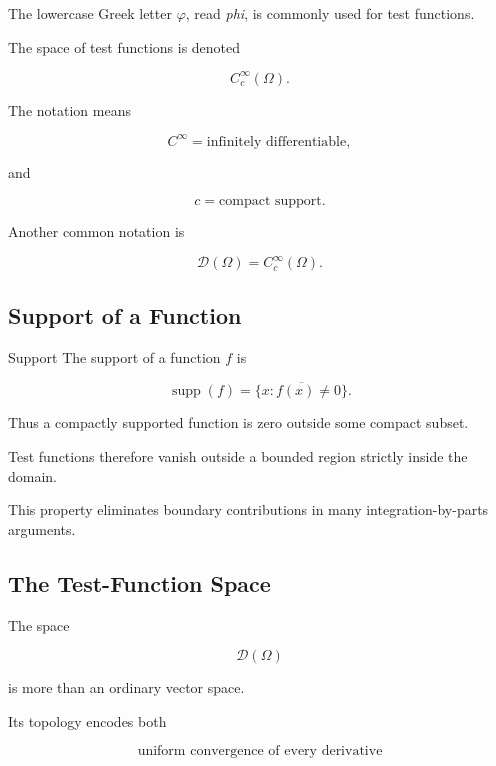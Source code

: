 The lowercase Greek letter \(\varphi\), read \emph{phi}, is commonly used
for test functions.

The space of test functions is denoted

\[
\boxed{
C_c^\infty(\Omega).
}
\]

The notation means

\[
\boxed{
C^\infty
=
\text{infinitely differentiable},
}
\]

and

\[
\boxed{
c
=
\text{compact support}.
}
\]

Another common notation is

\[
\boxed{
\mathcal{D}(\Omega)
=
C_c^\infty(\Omega).
}
\]

\subsection{Support of a Function}
\label{subsec:function-support-distributions}

\begin{definitionbox}{Support}
The support of a function \(f\) is

\[
\boxed{
\operatorname{supp}(f)
=
\overline{
\{x:f(x)\neq0\}
}.
}
\]
\end{definitionbox}

Thus a compactly supported function is zero outside some compact subset.

Test functions therefore vanish outside a bounded region strictly inside
the domain.

This property eliminates boundary contributions in many integration-by-parts
arguments.

\subsection{The Test-Function Space}
\label{subsec:test-function-space}

The space

\[
\mathcal{D}(\Omega)
\]

is more than an ordinary vector space.

Its topology encodes both

\[
\boxed{
\text{uniform convergence of every derivative}
}
\]

